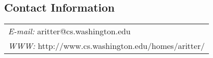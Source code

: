 \documentclass[margin,line]{res}
\begin{document}

\begin{resume}
\section{\sc Contact Information}
\vspace{.05in}
\begin{tabular}{@{}p{4in}}
{\it E-mail:}  aritter@cs.washington.edu \\       
{\it WWW:} http://www.cs.washington.edu/homes/aritter/ \\     
\end{tabular}




\end{resume}
\end{document}
